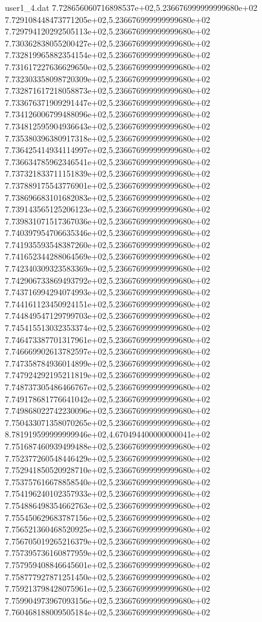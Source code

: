 \begin{filecontents}{user1_4.dat}
7.728656060716898537e+02,5.236676999999999680e+02
7.729108448473771205e+02,5.236676999999999680e+02
7.729794120292505113e+02,5.236676999999999680e+02
7.730362838055200427e+02,5.236676999999999680e+02
7.732819965882354154e+02,5.236676999999999680e+02
7.731617227636629650e+02,5.236676999999999680e+02
7.732303358098720309e+02,5.236676999999999680e+02
7.732871617218058873e+02,5.236676999999999680e+02
7.733676371909291447e+02,5.236676999999999680e+02
7.734126006799488096e+02,5.236676999999999680e+02
7.734812595904936643e+02,5.236676999999999680e+02
7.735380396380917318e+02,5.236676999999999680e+02
7.736425414934114997e+02,5.236676999999999680e+02
7.736634785962346541e+02,5.236676999999999680e+02
7.737321833711151839e+02,5.236676999999999680e+02
7.737889175543776901e+02,5.236676999999999680e+02
7.738696683101682083e+02,5.236676999999999680e+02
7.739143565125206123e+02,5.236676999999999680e+02
7.739831071517367036e+02,5.236676999999999680e+02
7.740397954706635346e+02,5.236676999999999680e+02
7.741935593548387260e+02,5.236676999999999680e+02
7.741652344288064569e+02,5.236676999999999680e+02
7.742340309323583369e+02,5.236676999999999680e+02
7.742906733869493792e+02,5.236676999999999680e+02
7.743716994294074993e+02,5.236676999999999680e+02
7.744161123450924151e+02,5.236676999999999680e+02
7.744849547129799703e+02,5.236676999999999680e+02
7.745415513032353374e+02,5.236676999999999680e+02
7.746473387701317961e+02,5.236676999999999680e+02
7.746669902613782597e+02,5.236676999999999680e+02
7.747358784936014899e+02,5.236676999999999680e+02
7.747924292195211819e+02,5.236676999999999680e+02
7.748737305486466767e+02,5.236676999999999680e+02
7.749178681776641042e+02,5.236676999999999680e+02
7.749868022742230096e+02,5.236676999999999680e+02
7.750433071358070265e+02,5.236676999999999680e+02
8.781919599999999946e+02,4.670494400000000041e+02
7.751687460939499488e+02,5.236676999999999680e+02
7.752377260548446429e+02,5.236676999999999680e+02
7.752941850520928710e+02,5.236676999999999680e+02
7.753757616678858540e+02,5.236676999999999680e+02
7.754196240102357933e+02,5.236676999999999680e+02
7.754886498354662763e+02,5.236676999999999680e+02
7.755450629683787156e+02,5.236676999999999680e+02
7.756521360468520925e+02,5.236676999999999680e+02
7.756705019265216379e+02,5.236676999999999680e+02
7.757395736160877959e+02,5.236676999999999680e+02
7.757959408846645601e+02,5.236676999999999680e+02
7.758777927871251450e+02,5.236676999999999680e+02
7.759213798428075961e+02,5.236676999999999680e+02
7.759904973967093156e+02,5.236676999999999680e+02
7.760468188009505184e+02,5.236676999999999680e+02

\end{filecontents}
